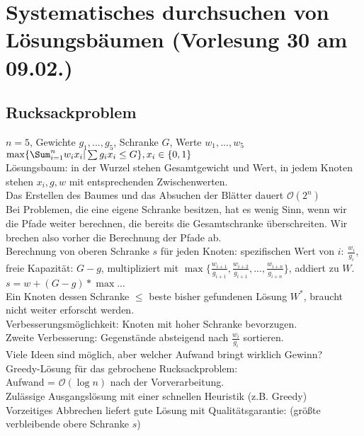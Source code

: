 \section{Systematisches durchsuchen von Lösungsbäumen \tiny (Vorlesung 30 am 09.02.)}
\subsection{Rucksackproblem}
$n=5$, Gewichte $g_1,...,g_5$, Schranke $G$, Werte $w_1,...,w_5$\\
$\max\{\Sum_{i=1}^n w_ix_i|\sum g_ix_i \leq G \}, x_i \in \{0,1\}$\\
Lösungsbaum: in der Wurzel stehen Gesamtgewicht und Wert, in jedem Knoten stehen $x_i, g, w$ mit entsprechenden Zwischenwerten.\\
Das Erstellen des Baumes und das Absuchen der Blätter dauert $\mathcal{O}(2^n)$\\

Bei Problemen, die eine eigene Schranke besitzen, hat es wenig Sinn, wenn wir die Pfade weiter berechnen, die bereits die Gesamtschranke überschreiten. Wir brechen also vorher die Berechnung der Pfade ab.\\
Berechnung von oberen Schranke $s$ für jeden Knoten:
spezifischen Wert von $i$: $\frac{w_i}{g_i}$, freie Kapazität: $G-g$, multipliziert mit $\max\{ \frac{w_{i+1}}{g_{i+1}},\frac{w_{i+2}}{g_{i+1}},...,\frac{w_{i+n}}{g_{i+n}} \}$, addiert zu $W$.\\
$s=w+(G-g)*\max...$\\
Ein Knoten dessen Schranke $\leq$ beste bisher gefundenen Lösung $W^*$, braucht nicht weiter erforscht werden.\\
Verbesserungsmöglichkeit: Knoten mit hoher Schranke bevorzugen.\\
Zweite Verbesserung: Gegenstände absteigend nach $\frac{w_i}{g_i}$ sortieren.\\
Viele Ideen sind möglich, aber welcher Aufwand bringt wirklich Gewinn?\\
Greedy-Lösung für das gebrochene Rucksackproblem:\\
Aufwand = $\mathcal{O}(\log n)$ nach der Vorverarbeitung.\\
Zulässige Ausgangslösung mit einer schnellen Heuristik (z.B. Greedy)\\
Vorzeitiges Abbrechen liefert gute Lösung mit Qualitätsgarantie: (größte verbleibende obere Schranke $s$)\\

